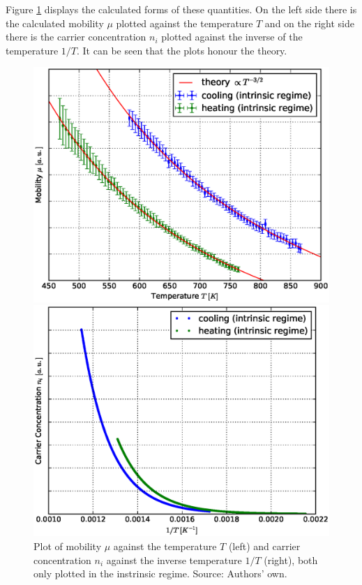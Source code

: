 \documentclass[a4paper]{article}
\begin{document}
Figure \ref{fig:theory} displays the calculated forms of these quantities. On the left side there is the calculated mobility $\mu$ plotted against the temperature $T$ and on the right side there is the carrier concentration $n_i$ plotted against the inverse of the temperature $1/T$. It can be seen that the plots  honour the theory.

\begin{figure}[H]
	\begin{minipage}[t]{0.5\textwidth}
		\begin{center}
		\includegraphics[width=1.0\textwidth]{plots/mobility_vs_temp.eps}
		\end{center}
	\end{minipage}
	\begin{minipage}[t]{0.5\textwidth}
		\begin{center}
		\includegraphics[width=1.0\textwidth]{plots/n_vs_temp_inverse.eps}
		\end{center}
	\end{minipage}
	\caption{Plot of mobility $\mu$ against the temperature $T$ (left) and carrier concentration $n_i$ against the inverse temperature $1/T$ (right), both only plotted in the instrinsic regime. Source: Authors' own.}
	\label{fig:theory}
\end{figure}
\end{document}
